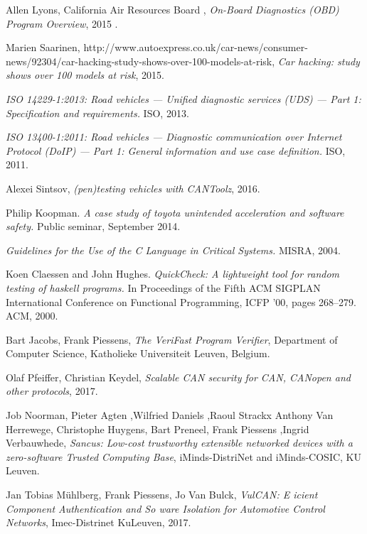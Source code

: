 \documentclass[11pt]{article}
\begin{document}
\begin{thebibliography}{10}
	Allen Lyons, California Air Resources Board ,
	\textit{On-Board Diagnostics (OBD) Program Overview},
	2015 .
	
	Marien Saarinen, http://www.autoexpress.co.uk/car-news/consumer-news/92304/car-hacking-study-shows-over-100-models-at-risk, 
	\textit{Car hacking: study shows over 100 models at risk},
	2015.
	
	\textit{ISO 14229-1:2013: Road vehicles — Unified diagnostic services (UDS) — Part 1: Specification and requirements.}
	ISO, 2013.
	
	\textit{ISO 13400-1:2011: Road vehicles — Diagnostic communication over Internet Protocol (DoIP) — Part 1: General information and use case definition.} ISO, 2011.
	
	Alexei Sintsov, 
	\textit{(pen)testing vehicles with CANToolz},
	2016.
	
	Philip Koopman. \textit{A case study of toyota unintended acceleration and software safety.} Public seminar, September 2014.
	
	\textit{Guidelines for the Use of the C Language in Critical Systems.} MISRA, 2004.
	
	Koen Claessen and John Hughes. 
	\textit{QuickCheck: A lightweight tool for random testing of haskell programs.} In Proceedings of the Fifth ACM SIGPLAN International Conference on Functional Programming, ICFP ’00, pages 268–279. ACM, 2000.
	
	Bart Jacobs, Frank Piessens,
	\textit{The VeriFast Program Verifier}, Department of Computer Science, Katholieke Universiteit Leuven, Belgium.
	
	Olaf Pfeiffer, Christian Keydel, 
	\textit{Scalable CAN security for CAN, CANopen and other protocols}, 2017.
	
	Job Noorman, Pieter Agten ,Wilfried Daniels ,Raoul Strackx
	Anthony Van Herrewege, Christophe Huygens, Bart Preneel, Frank Piessens
    ,Ingrid Verbauwhede, \textit{Sancus: Low-cost trustworthy extensible networked devices with a zero-software Trusted Computing Base}, iMinds-DistriNet and iMinds-COSIC, KU Leuven.
    
    Jan Tobias Mühlberg, Frank Piessens, Jo Van Bulck,
    \textit{VulCAN: E icient Component Authentication and So ware Isolation for Automotive Control Networks}, Imec-Distrinet KuLeuven, 2017.
    

\end{thebibliography}
\end{document}
